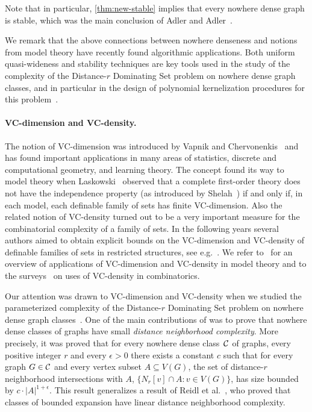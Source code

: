 Note that in particular, \cref{thm:new-stable} implies that every nowhere dense graph is stable, which was the main conclusion of Adler and Adler~\cite{adler2014interpreting}.

We remark that the above connections between nowhere denseness and notions from model theory have recently found algorithmic applications.
Both uniform quasi-wideness and stability techniques are key tools used in the study of the complexity of the {\sc Distance-$r$ Dominating Set} problem on nowhere dense graph classes,
and in particular in the design of polynomial kernelization procedures for this problem~\cite{DawarK09,drange2016kernelization,eickmeyer2016neighborhood,siebertz2016polynomial}.

\paragraph{VC-dimension and VC-density.} The notion of VC-dimension was introduced by 
Vapnik and Chervonenkis~\cite{chervonenkis1971theory} and 
has found important applications in many areas of
statistics, discrete and computational geometry, 
and learning theory. The concept found its way to
model theory when Laskowski~\cite{laskowski1992vapnik} 
observed that a complete first-order theory does not have
the independence property (as introduced by 
Shelah~\cite{shelah1971stability}) if and only if, 
in each model, each definable family of sets has finite 
VC-dimension. Also the related notion of VC-density 
turned out to be a very important measure for 
the combinatorial complexity of a family of sets. 
In the following years several authors 
aimed to obtain explicit bounds on the VC-dimension 
and VC-density of 
definable families of sets in restricted 
structures, see e.g.~\cite{AschenbrennerDHMS13, aschenbrenner2016vapnik, bobkov2017computations, johnson2010compression, karpinski1997approximating, 
karpinski1997polynomial}. We refer to~\cite{aschenbrenner2016vapnik} for an overview of 
applications of VC-dimension and VC-density in model
theory and to the surveys~\cite{furedi1991traces,matouvsek1998geometric} 
on uses of VC-density in
combinatorics. 

Our attention was drawn to VC-dimension and 
VC-density when we studied the parameterized 
complexity of the {\sc Distance-$r$ Dominating Set} 
problem on nowhere dense graph classes~\cite{eickmeyer2016neighborhood}. 
One of the main contributions of \cite{eickmeyer2016neighborhood}
was to prove that nowhere dense classes of graphs have small
\emph{distance neighborhood complexity}. More precisely, it
was proved that for every nowhere dense class~$\mathcal{C}$ of 
graphs, every positive integer $r$ and every $\epsilon>0$ there
exists a constant $c$ such that for every graph $G\in\mathcal{C}$ and
every vertex subset $A\subseteq V(G)$, the set of distance-$r$ neighborhood intersections with $A$,
$\{N_r[v]\cap A : v\in V(G)\}$,
has size bounded by $c\cdot |A|^{1+\epsilon}$. This result
generalizes a result of Reidl et al.~\cite{reidl2016characterising}, who proved that classes of bounded expansion have linear distance neighborhood complexity. 


